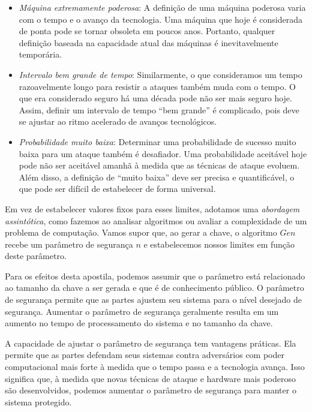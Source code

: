 \begin{itemize}
\item {\em Máquina extremamente poderosa}:
  A definição de uma máquina poderosa varia com o tempo e o avanço da tecnologia.
  Uma máquina que hoje é considerada de ponta pode se tornar obsoleta em poucos anos.
  Portanto, qualquer definição baseada na capacidade atual das máquinas é inevitavelmente temporária.

\item {\em Intervalo bem grande de tempo}:
  Similarmente, o que consideramos um tempo razoavelmente longo para resistir a ataques também muda com o tempo.
  O que era considerado seguro há uma década pode não ser mais seguro hoje.
  Assim, definir um intervalo de tempo ``bem grande'' é complicado, pois deve se ajustar ao ritmo acelerado de avanços tecnológicos.

\item {\em Probabilidade muito baixa}:
  Determinar uma probabilidade de sucesso muito baixa para um ataque também é desafiador.
  Uma probabilidade aceitável hoje pode não ser aceitável amanhã à medida que as técnicas de ataque evoluem.
  Além disso, a definição de ``muito baixa'' deve ser precisa e quantificável, o que pode ser difícil de estabelecer de forma universal.
\end{itemize}

Em vez de estabelecer valores fixos para esses limites, adotamos uma {\em abordagem assintótica}, como fazemos ao analisar algoritmos ou avaliar a complexidade de um problema de computação.
Vamos supor que, ao gerar a chave, o algoritmo $Gen$ recebe um parâmetro de segurança $n$ e estabelecemos nossos limites em função deste parâmetro.

Para os efeitos desta apostila, podemos assumir que o parâmetro está relacionado ao tamanho da chave a ser gerada e que é de conhecimento público.
O parâmetro de segurança permite que as partes ajustem seu sistema para o nível desejado de segurança.
Aumentar o parâmetro de segurança geralmente resulta em um aumento no tempo de processamento do sistema e no tamanho da chave.

A capacidade de ajustar o parâmetro de segurança tem vantagens práticas.
Ela permite que as partes defendam seus sistemas contra adversários com poder computacional mais forte à medida que o tempo passa e a tecnologia avança.
Isso significa que, à medida que novas técnicas de ataque e hardware mais poderoso são desenvolvidos, podemos aumentar o parâmetro de segurança para manter o sistema protegido.

